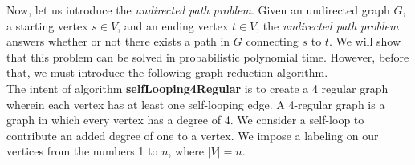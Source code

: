 \documentclass[psamsfonts, 10pt]{amsart}
\theoremstyle{definition}
\theoremstyle{remark}
\numberwithin{equation}{section}
\begin{document}
Now, let us introduce the {\it undirected path problem}. Given an undirected graph $G$, a starting vertex $s \in V$, and an ending vertex $t \in V$, the {\it undirected path problem} answers whether or not there exists a path in $G$ connecting $s$ to $t$. We will show that this problem can be solved in probabilistic polynomial time. However, before that, we must introduce the following graph reduction algorithm.\\

The intent of algorithm {\bf selfLooping4Regular} is to create a 4 regular graph wherein each vertex has at least one self-looping edge. A 4-regular graph is a graph in which every vertex has a degree of 4. We consider a self-loop to contribute an added degree of one to a vertex. We impose a labeling on our vertices from the numbers 1 to $n$, where $\lvert V \rvert = n$.\\
\end{document}
